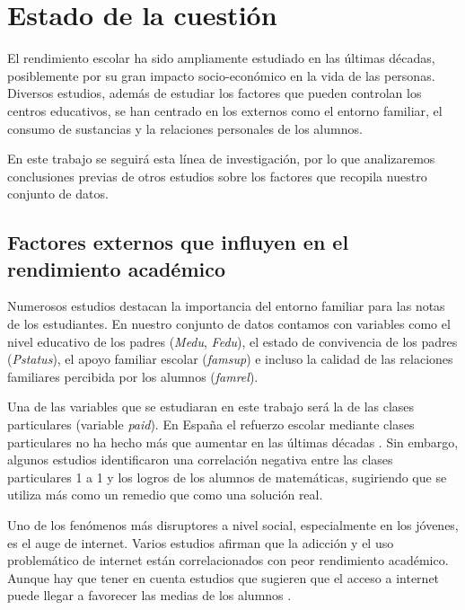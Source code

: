 \chapter{Estado de la cuestión}

El rendimiento escolar ha sido ampliamente estudiado en las últimas décadas, posiblemente por su gran impacto socio-económico en la vida de las personas. Diversos estudios, además de estudiar los factores que pueden controlan los centros educativos, se han centrado en los externos como el entorno familiar, el consumo de sustancias y la relaciones personales de los alumnos.

En este trabajo se seguirá esta línea de investigación, por lo que analizaremos conclusiones previas de otros estudios sobre los factores que recopila nuestro conjunto de datos.

\section{Factores externos que influyen en el rendimiento académico}

Numerosos estudios \cite{mendez2018clima}\cite{sanchez2015entorno} destacan la importancia del entorno familiar para las notas de los estudiantes. En nuestro conjunto de datos contamos con variables como el nivel educativo de los padres (\textit{Medu}, \textit{Fedu}), el estado de convivencia de los padres (\textit{Pstatus}), el apoyo familiar escolar (\textit{famsup}) e incluso la calidad de las relaciones familiares percibida por los alumnos (\textit{famrel}).

Una de las variables que se estudiaran en este trabajo será la de las clases particulares (variable \textit{paid}). En España el refuerzo escolar mediante clases particulares no ha hecho más que aumentar en las últimas décadas \cite{RunteGeidel2013}. Sin embargo, algunos estudios \cite{baker2001worldwide} \cite{wiseman2021does} identificaron una correlación negativa entre las clases particulares 1 a 1 y los logros de los alumnos de matemáticas, sugiriendo que se utiliza más como un remedio que como una solución real.

Uno de los fenómenos más disruptores a nivel social, especialmente en los jóvenes, es el auge de internet. Varios estudios \cite{ramos2017procrastinacion} \cite{vila2018rendimiento} afirman que la adicción y el uso problemático de internet están correlacionados con peor rendimiento académico. Aunque hay que tener en cuenta estudios que sugieren que el acceso a internet puede llegar a favorecer las medias de los alumnos \cite{garcia2022analisis}.


